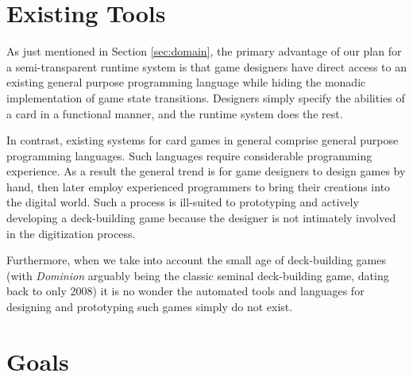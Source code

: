 \documentclass{acm_proc_article-sp}
\begin{document}
\section{Existing Tools}
\label{sec:existing_tools}

As just mentioned in Section \ref{sec:domain}, the primary advantage of our
plan for a semi-transparent runtime system \footnotemark[1] is that game
designers have direct access to an existing general purpose programming
language while hiding the
monadic implementation of game state transitions. Designers simply specify
the abilities of a card in a functional manner, and the runtime system does
the rest.


In contrast, existing systems for card games in general comprise general
purpose programming languages. Such languages require considerable
programming experience. As a result the general trend is for game designers
to design games by hand, then later employ experienced programmers to
bring their creations into the digital world. Such a process is ill-suited
to prototyping and actively developing a deck-building game because the
designer is not intimately involved in the digitization process.

Furthermore, when we take into account the small age
of deck-building games (with \emph{Dominion} arguably
being the classic seminal deck-building game, dating back to only 2008)
it is no wonder the automated tools and languages for designing and
prototyping such games simply do not exist.

\section{Goals}
\label{sec:goals}
\end{document}
